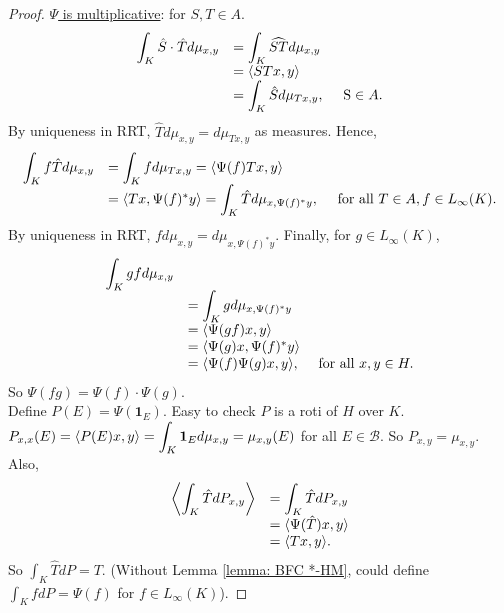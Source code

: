 \documentclass{article}
\begin{document}
\begin{proof}
    \noindent\underline{$\Psi$ is multiplicative}: for $S,T\in A$. 
    $$
    \begin{array}{ll}
        \displaystyle\int_K \hat{S}\cdot\hat{T}d\mu_{x,y} &= \displaystyle\int_K \widehat{ST}d\mu_{x,y}\\
        &= \langle STx, y\rangle\\
        &= \displaystyle\int_K \hat{S}d\mu_{Tx,y}, \quad \text{ S}\in A.
    \end{array}
    $$
    By uniqueness in RRT, $\hat{T}d\mu_{x,y}=d\mu_{Tx,y}$ as measures. Hence, 
    $$
    \begin{array}{ll}
        \displaystyle\int_K f\hat{T}d\mu_{x,y}
        & = \displaystyle\int_K fd\mu_{Tx,y} = \langle \Psi(f)Tx, y\rangle\\
        &= \langle Tx, \Psi(f)^*y\rangle=\displaystyle\int_K \hat{T}d\mu_{x,\Psi(f)^*y}, \quad \text{ for all }T\in A, f\in L_\infty(K).
    \end{array}
    $$
    By uniqueness in RRT, $fd\mu_{x,y}=d\mu_{x,\Psi(f)^*y}$. Finally, for $g\in L_\infty(K)$, 
    $$
    \begin{array}{ll}
        \displaystyle\int_K gfd\mu_{x,y}\\
        &= \displaystyle\int_K gd\mu_{x,\Psi(f)^*y}\\
        &= \langle \Psi(gf)x, y\rangle\\
        &=\langle \Psi(g)x, \Psi(f)^*y\rangle\\
        &=\langle \Psi(f)\Psi(g)x, y\rangle, \quad \text{ for all }x,y\in H. 
    \end{array}
    $$
    So $\Psi(fg) = \Psi(f)\cdot \Psi(g)$.\\

    Define $P(E) = \Psi(\mathbf{1}_E)$. Easy to check $P$ is a roti of $H$ over $K$. $P_{x,x}(E)=\langle P(E)x, y\rangle=\displaystyle\int_K \mathbf{1}_E d\mu_{x,y} = \mu_{x,y}(E)$ for all $E\in \mathcal{B}$. So $P_{x,y}=\mu_{x,y}$. Also, 
    $$
    \begin{array}{ll}
        \left\langle \displaystyle\int_K \hat{T}dP_{x, y}\right\rangle &= \displaystyle\int_K \hat{T}dP_{x,y}\\
        &=\langle \Psi(\hat{T})x, y\rangle\\
        &=\langle Tx, y\rangle.
    \end{array}
    $$ 
    So $\displaystyle\int_K \hat{T}dP = T$. (Without Lemma \ref{lemma: BFC *-HM}, could define $\displaystyle\int_K fdP = \Psi(f)$ for $f\in L_\infty(K)$).


\end{proof}
\end{document}
